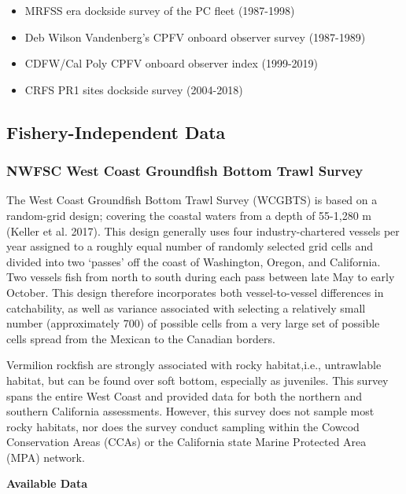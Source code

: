 \documentclass[
  english,
  a4paper,
]{article}
\providecommand{\tightlist}{%
  \setlength{\itemsep}{0pt}\setlength{\parskip}{0pt}}
\begin{document}
\begin{itemize}
\tightlist
\item
  MRFSS era dockside survey of the PC fleet (1987-1998)
\item
  Deb Wilson Vandenberg's CPFV onboard observer survey (1987-1989)
\item
  CDFW/Cal Poly CPFV onboard observer index (1999-2019)
\item
  CRFS PR1 sites dockside survey (2004-2018)
\end{itemize}

\hypertarget{fishery-independent-data}{%
\subsection{Fishery-Independent Data}\label{fishery-independent-data}}

\hypertarget{nwfsc-west-coast-groundfish-bottom-trawl-survey}{%
\subsubsection{NWFSC West Coast Groundfish Bottom Trawl Survey}\label{nwfsc-west-coast-groundfish-bottom-trawl-survey}}

The West Coast Groundfish Bottom Trawl Survey (WCGBTS) is based on a random-grid design;
covering the coastal waters from a depth of 55-1,280 m (Keller et al. 2017).
This design generally uses four industry-chartered vessels per year assigned to
a roughly equal number of randomly selected grid cells and divided into two `passes'
off the coast of Washington, Oregon, and California. Two vessels fish from north to south during each pass between late
May to early October. This design therefore incorporates both vessel-to-vessel
differences in catchability, as well as variance associated with selecting a
relatively small number (approximately 700) of possible cells from a very large
set of possible cells spread from the Mexican to the Canadian borders.

Vermilion rockfish are strongly associated with rocky
habitat,i.e., untrawlable habitat, but can be found over soft bottom, especially as
juveniles. This survey spans the entire West Coast and provided data for both the northern
and southern California assessments. However, this survey does not sample most rocky habitats, nor does the survey conduct sampling within the Cowcod Conservation Areas (CCAs) or the California state Marine Protected Area (MPA) network.

\textbf{Available Data}
\end{document}
